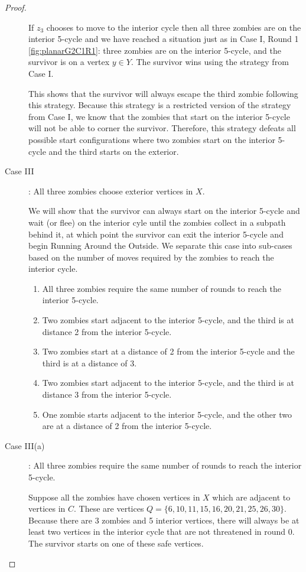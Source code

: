 \begin{proof}
\begin{description}
If $z_3$ chooses to move to the interior cycle then all three zombies are on the interior 5-cycle and we have reached a situation just as in Case I, Round 1 \ref{fig:planarG2C1R1}: three zombies are on the interior 5-cycle, and the survivor is on a vertex $y\in Y$. The survivor wins using the strategy from Case I.

This shows that the survivor will always escape the third zombie following this strategy. Because this strategy is a restricted version of the strategy from
Case I, we know that the zombies that start on the interior 5-cycle will not be able to corner the survivor. Therefore, this strategy defeats all possible
start configurations where two zombies start on the interior 5-cycle and the third starts on the exterior.

\item[Case III \label{planar case 3}]: All three zombies choose exterior vertices in $X$.

We will show that the survivor can always start on the interior 5-cycle and wait (or flee) on the interior cyle until the zombies collect in a subpath behind it, at which point the survivor can exit the interior 5-cycle and begin Running Around the Outside. We separate this case into sub-cases based on the number of moves required by the zombies to reach the interior cycle.

\begin{enumerate}
  \item All three zombies require the same number of rounds to reach the interior 5-cycle.
  \item Two zombies start adjacent to the interior 5-cycle, and the third is at distance 2 from the interior 5-cycle.
  \item Two zombies start at a distance of 2 from the interior 5-cycle and the third is at a distance of 3.
  \item Two zombies start adjacent to the interior 5-cycle, and the third is at distance 3 from the interior 5-cycle.
  \item One zombie starts adjacent to the interior 5-cycle, and the other two are at a distance of 2 from the interior 5-cycle.
\end{enumerate}


\item[Case III(a)]: All three zombies require the same number of rounds to reach the interior 5-cycle.

Suppose all the zombies have chosen vertices in $X$ which are adjacent to vertices in $C$. These are vertices $Q = \{6, 10, 11, 15, 16, 20, 21, 25, 26, 30 \}$.
Because there are 3 zombies and 5 interior vertices, there will always be at least two vertices in the interior cycle that are not threatened in
round 0. The survivor starts on one of these safe vertices.


\end{description}
\end{proof}
